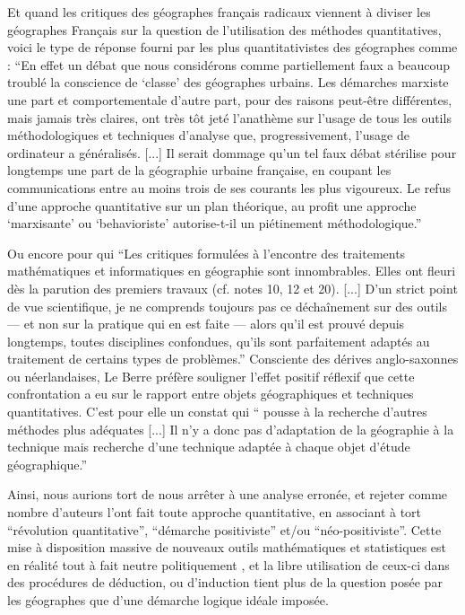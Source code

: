 Et quand les critiques des géographes français radicaux viennent à diviser les géographes Français sur la question de l'utilisation des méthodes quantitatives, voici le type de réponse fourni par les plus quantitativistes des géographes comme \textcite[337-338]{Pumain1983} : \enquote{En effet un débat que nous considérons comme partiellement faux a beaucoup troublé la conscience de \enquote{classe} des géographes urbains. Les démarches marxiste une part et comportementale d'autre part, pour des raisons peut-être différentes, mais jamais très claires, ont très tôt jeté l'anathème sur l'usage de tous les outils méthodologiques et techniques d'analyse que, progressivement, l'usage de ordinateur a généralisés. [...] Il serait dommage qu'un tel faux débat stérilise pour longtemps une part de la géographie urbaine française, en coupant les communications entre au moins trois de ses courants les plus vigoureux. Le refus d'une approche quantitative sur un plan théorique, au profit une approche \enquote{marxisante} ou \enquote{behavioriste} autorise-t-il un piétinement méthodologique.}

Ou encore \textcite[11]{LeBerre1987} pour qui \enquote{Les critiques formulées à l'encontre des traitements mathématiques et informatiques en géographie sont innombrables. Elles ont fleuri dès la parution des premiers travaux (cf. notes 10, 12 et 20). [...] D'un strict point de vue scientifique, je ne comprends toujours pas ce déchaînement sur des outils — et non sur la pratique qui en est faite — alors qu'il est prouvé depuis longtemps, toutes disciplines confondues, qu'ils sont parfaitement adaptés au traitement de certains types de problèmes.} Consciente des dérives anglo-saxonnes ou néerlandaises, Le Berre préfère souligner l'effet positif réflexif que cette confrontation a eu sur le rapport entre objets géographiques et techniques quantitatives. C'est pour elle un constat qui \enquote{ pousse à la recherche d’autres méthodes plus adéquates [...] Il n’y a donc pas d’adaptation de la géographie à la technique mais recherche d'une technique adaptée à chaque objet d'étude géographique.}

Ainsi, nous aurions tort de nous arrêter à une analyse erronée, et rejeter comme nombre d'auteurs l'ont fait toute approche quantitative, en associant à tort \enquote{révolution quantitative}, \enquote{démarche positiviste} et/ou \enquote{néo-positiviste}. Cette mise à disposition massive de nouveaux outils mathématiques et statistiques est en réalité tout à fait neutre politiquement \autocite{Sheppard2001}, et la libre utilisation de ceux-ci dans des procédures de déduction, ou d'induction tient plus de la question posée par les géographes que d'une démarche logique idéale imposée. \autocite{Sanders2000}

